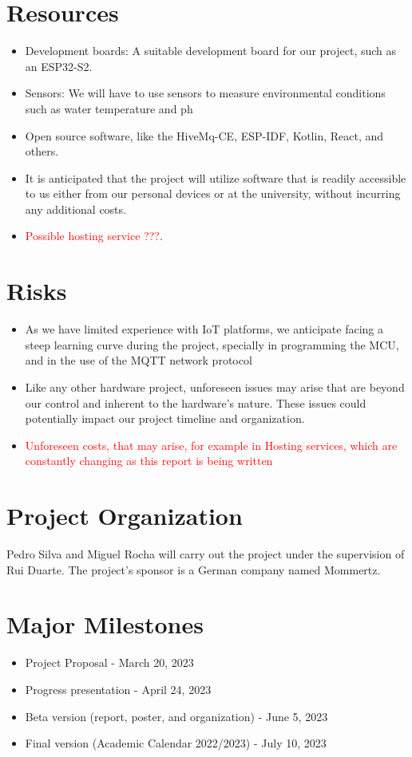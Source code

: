 \documentclass[a4paper,twoside,11pt]{article}
\begin{document}
\section{Resources}
    \begin{itemize}
        \item Development boards: A suitable development board for our project, such as an ESP32-S2.
        \item Sensors: We will have to use sensors to measure environmental conditions such as water temperature and ph
        \item Open source software, like the HiveMq-CE, ESP-IDF, Kotlin, React, and others.
        \item It is anticipated that the project will utilize software that is readily accessible to us either from our personal devices or at the university, without incurring any additional costs.
        \item  \textcolor{red}{Possible hosting service ???}.
    \end{itemize}


\section{Risks}
    \begin{itemize}
        \item As we have limited experience with IoT platforms, we anticipate facing a steep learning curve during the project, specially in programming the MCU, and in the use of the MQTT network protocol
        \item Like any other hardware project, unforeseen issues may arise that are beyond our control and inherent to the hardware's nature. These issues could potentially impact our project timeline and organization.
        \item \textcolor{red}{Unforeseen costs, that may arise, for example in Hosting services, which are constantly changing as this report is being written}
    \end{itemize}

\section{Project Organization}
Pedro Silva and Miguel Rocha will carry out the project under the supervision of Rui Duarte. The project's sponsor is a German company named Mommertz.

\section{Major Milestones}
    \begin{itemize}
        \item Project Proposal -  March 20, 2023
        \item Progress presentation -  April 24, 2023
        \item Beta version (report, poster, and organization) -  June 5, 2023
        \item Final version (Academic Calendar 2022/2023) -  July 10, 2023 
    \end{itemize}

    


\end{document}
